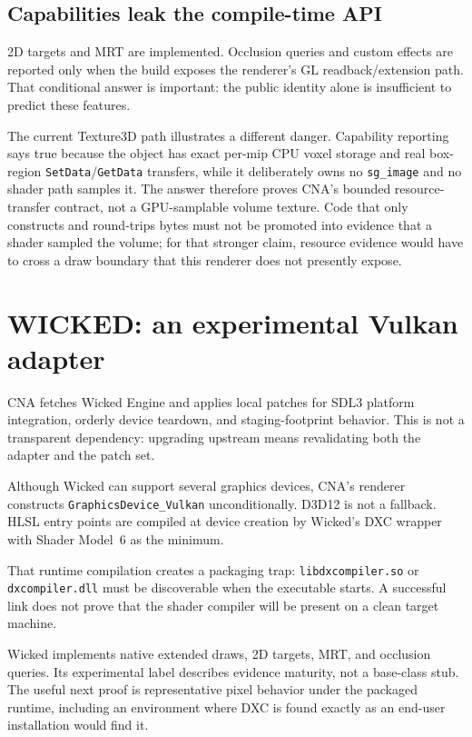 \subsection{Capabilities leak the compile-time API}

2D targets and MRT are implemented.  Occlusion queries and custom effects are reported only
when the build exposes the renderer's GL readback/extension path.  That conditional answer is
important: the public identity alone is insufficient to predict these features.

The current Texture3D path illustrates a different danger.  Capability reporting says true
because the object has exact per-mip CPU voxel storage and real box-region
\texttt{SetData}/\texttt{GetData} transfers, while it deliberately owns no
\texttt{sg\_image} and no shader path samples it.  The answer therefore proves CNA's bounded
resource-transfer contract, not a GPU-samplable volume texture. Code that only constructs and
round-trips bytes must not be promoted into evidence that a shader sampled the volume; for
that stronger claim, resource evidence would have to cross a draw boundary that this renderer
does not presently expose.

\section{WICKED: an experimental Vulkan adapter}

CNA fetches Wicked Engine and applies local patches for SDL3 platform integration, orderly
device teardown, and staging-footprint behavior.  This is not a transparent dependency:
upgrading upstream means revalidating both the adapter and the patch set.

Although Wicked can support several graphics devices, CNA's renderer constructs
\texttt{GraphicsDevice\_Vulkan} unconditionally.  D3D12 is not a fallback.  HLSL entry points
are compiled at device creation by Wicked's DXC wrapper with Shader Model~6 as the minimum.

That runtime compilation creates a packaging trap: \texttt{libdxcompiler.so} or
\texttt{dxcompiler.dll} must be discoverable when the executable starts.  A successful link
does not prove that the shader compiler will be present on a clean target machine.

Wicked implements native extended draws, 2D targets, MRT, and occlusion queries.  Its
experimental label describes evidence maturity, not a base-class stub.  The useful next proof
is representative pixel behavior under the packaged runtime, including an environment where
DXC is found exactly as an end-user installation would find it.


